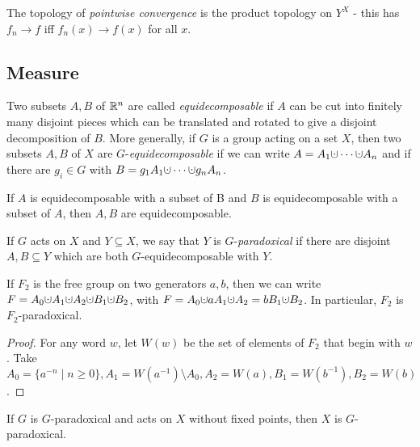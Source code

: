 \documentclass[letterpaper,11pt]{report}
\begin{document}
\begin{defn} The topology of \emph{pointwise convergence} is the product topology on $Y^X$ - this has $f_n \rightarrow f$ iff $f_n(x) \rightarrow f(x)$ for all $x$.
\end{defn}


\subsection{Measure}

\begin{defn} Two subsets $A,B$ of $\mathbb{R}^n$ are called \emph{equidecomposable} if $A$ can be cut into finitely many disjoint pieces which can be translated and rotated to give a disjoint decomposition of $B$. More generally, if $G$ is a group acting on a set $X$, then two subsets $A,B$ of $X$ are $G$-\emph{equidecomposable} if we can write $A = A_1 \dotcup \cdots \dotcup A_n$ and if there are $g_i \in G$ with $B = g_1A_1 \dotcup \cdots \dotcup g_nA_n$.%
\end{defn}

\begin{prop} If $A$ is equidecomposable with a subset of B and $B$ is equidecomposable with a subset of $A$, then $A,B$ are equidecomposable.
\end{prop}

\begin{defn} If $G$ acts on $X$ and $Y \subseteq X$, we say that $Y$ is $G$-\emph{paradoxical} if there are disjoint $A,B \subseteq Y$ which are both $G$-equidecomposable with $Y$.
\end{defn}

\begin{prop} If $F_2$ is the free group on two generators $a,b$, then we can write $F = A_0 \dotcup A_1 \dotcup A_2 \dotcup B_1 \dotcup B_2$, with $F = A_0 \dotcup aA_1 \dotcup A_2 = bB_1 \dotcup B_2$. In particular, $F_2$ is $F_2$-paradoxical.
\end{prop}
\begin{proof} For any word $w$, let $W(w)$ be the set of elements of $F_2$ that begin with $w$. Take $A_0 = \{a^{-n} \mid n \ge 0\}, A_1 = W(a^{-1})\setminus A_0, A_2 = W(a), B_1 = W(b^{-1}), B_2 = W(b)$.
\end{proof}

\begin{prop} If $G$ is $G$-paradoxical and acts on $X$ without fixed points, then $X$ is $G$-paradoxical.
\end{prop}
\end{document}
